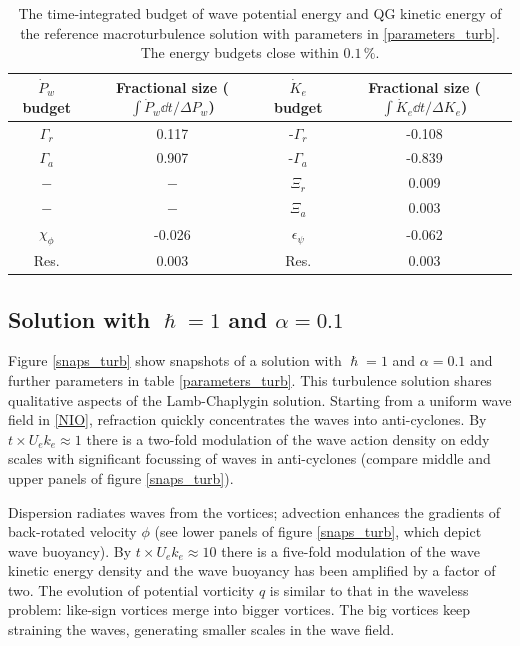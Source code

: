 \documentclass{jfm}
\begin{document}
 \begin{table}
 \begin{center}
     \caption{The time-integrated budget of wave potential energy and QG
              kinetic energy of the reference macroturbulence solution with
              parameters in \ref{parameters_turb}. The energy budgets close
              within $0.1\,\%$.\label{table2}}
 \begin{tabular}{c|c|c|c}
 \hline
 $\dot{P}_w$ budget & Fractional size ($\int\dot{P}_w \dd t/\Delta P_w $) & $\dot{K}_e$ budget  & Fractional size ($\int\dot{K}_e \dd t/\Delta K_e$)\\
 \hline
 $\Gamma_r$ & 0.117 & -$\Gamma_r$ & -0.108 \\
 $\Gamma_a$ & 0.907 & -$\Gamma_a$ & -0.839 \\
 $-$ & $-$ & $\Xi_r$ & 0.009 \\
 $-$ & $-$ & $\Xi_a$ & 0.003 \\
 $\chi_\phi$ & -0.026 & $\epsilon_\psi$ & -0.062 \\
 Res. & 0.003 & Res. & 0.003 \\
 \end{tabular}
 \end{center}
 \end{table}


\subsection{Solution with $\hslash = 1$ and $\alpha = 0.1$}

Figure \ref{snaps_turb} show snapshots of a solution with
$\hslash = 1$ and $\alpha = 0.1$ and further parameters in table \ref{parameters_turb}.
This turbulence solution shares qualitative aspects of the Lamb-Chaplygin solution.
Starting from a uniform wave field in \eqref{NIO}, refraction quickly concentrates the waves into
anti-cyclones. By
$t\times U_e k_e \approx 1$ there is a two-fold modulation of the wave action
density on eddy scales with significant focussing of waves in anti-cyclones
(compare middle and upper panels of figure \ref{snaps_turb}).

Dispersion radiates waves from the vortices; advection enhances
the gradients of  back-rotated velocity $\phi$  (see lower panels of figure \ref{snaps_turb},
which depict wave buoyancy). By $t\times U_e k_e \approx 10$ there is a five-fold
modulation of the wave kinetic energy density and the wave buoyancy has been
amplified by a factor of two. The evolution of  potential vorticity $q$ is  similar to  that in the
waveless problem: like-sign vortices merge into bigger vortices. The big vortices keep straining the waves, generating smaller  scales in the wave field.
\end{document}
